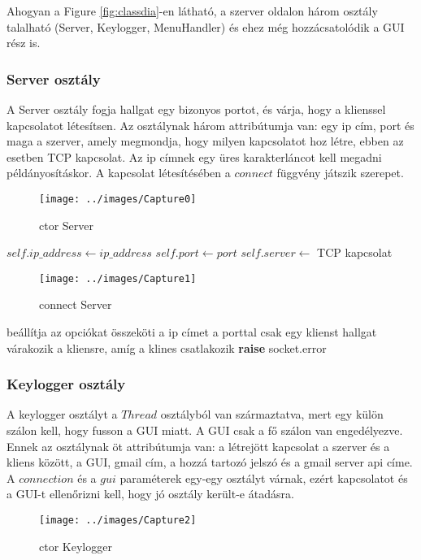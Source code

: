 \documentclass[a4paper, 11pt]{article}
\begin{document}
Ahogyan a Figure \ref{fig:classdia}-en látható, a szerver oldalon három osztály talalható (Server, Keylogger, MenuHandler) és ehez még hozzácsatolódik a GUI rész is.

\subsubsection{Server osztály}\label{subsubsec:serverclass}
A Server osztály fogja hallgat egy bizonyos portot, és várja, hogy a klienssel kapcsolatot létesítsen. Az osztálynak három attribútumja van: egy ip cím, port és maga a szerver, amely megmondja, hogy milyen kapcsolatot hoz létre, ebben az esetben TCP kapcsolat. Az ip címnek egy üres karakterláncot kell megadni példányosításkor. A kapcsolat létesítésében a $connect$ függvény játszik szerepet.
\begin{figure}[H]
\centering
\texttt{[image: ../images/Capture0]}
\caption{ctor Server}
\label{fig:ctorserver}
\end{figure}

\begin{algorithmic}[H]
	\State $self.ip\_address \gets ip\_address$
	\State $self.port \gets port$
	\State $self.server \gets$ TCP kapcsolat
\EndFunction
\end{algorithmic}

\begin{figure}[H]
\centering
\texttt{[image: ../images/Capture1]}
\caption{connect Server}
\label{fig:connect}
\end{figure}

\begin{algorithmic}[H]
	\State beállítja az opciókat
	\State összeköti a ip címet a porttal
	\State csak egy klienst hallgat
	\try
		\State várakozik a kliensre, amíg a klines csatlakozik
		\State \textbf{raise} socket.error
	\endtry
\EndFunction
\end{algorithmic}

\subsubsection{Keylogger osztály}\label{subsubsec:keyloggerclass}
A keylogger osztályt a $Thread$ osztályból van származtatva, mert egy külön szálon kell, hogy fusson a GUI miatt. A GUI csak a fő szálon van engedélyezve. Ennek az osztálynak öt attribútumja van: a létrejött kapcsolat a szerver és a kliens között, a GUI, gmail cím, a hozzá tartozó jelszó és a gmail server api címe. A $connection$ és a $gui$ paraméterek egy-egy osztályt várnak, ezért kapcsolatot és a GUI-t ellenőrizni kell, hogy jó osztály került-e átadásra.
\begin{figure}[H]
\centering
\texttt{[image: ../images/Capture2]}
\caption{ctor Keylogger}
\label{fig:ctorkeylogger}
\end{figure}
\end{document}
